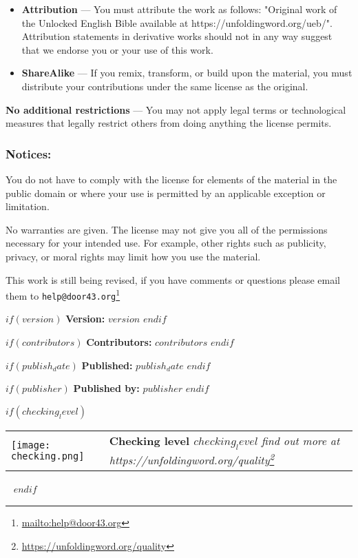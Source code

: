 \documentclass[$fontsize$pt,$if(lang)$$lang$,$endif$$if(papersize)$$papersize$,$endif$$for(classoption)$$classoption$$sep$,$endfor$,openany]{$documentclass$}
\renewcommand{\href}[2]{#2\footnote{\url{#1}}}
\begin{document}
\begin{itemize}
\item \textbf{Attribution} — You must attribute the work as follows: "Original work of the Unlocked English Bible available at https://unfoldingword.org/ueb/". Attribution statements in derivative works should not in any way suggest that we endorse you or your use of this work.
\item \textbf{ShareAlike} — If you remix, transform, or build upon the material, you must distribute your contributions under the same license as the original.
\end{itemize}

\textbf{No additional restrictions} — You may not apply legal terms or technological measures that legally restrict others from doing anything the license permits.

\subsubsection{Notices:}

You do not have to comply with the license for elements of the material in the public domain or where your use is permitted by an applicable exception or limitation.

No warranties are given. The license may not give you all of the permissions necessary for your intended use. For example, other rights such as publicity, privacy, or moral rights may limit how you use the material.

This work is still being revised, if you have comments or questions please email them to \href{mailto:help@door43.org}{\nolinkurl{help@door43.org}}

\vspace{10 mm}

$if(version)$
  \textbf{Version:} $version$
$endif$

$if(contributors)$
  \textbf{Contributors:} $contributors$
$endif$

$if(publish_date)$
  \textbf{Published:} $publish_date$
$endif$

$if(publisher)$
  \textbf{Published by:} $publisher$
$endif$

$if(checking_level)$
\begin{tabular}{@{}p{1.5cm} p{10cm}@{}}
    \vspace{0pt}
    \texttt{[image: checking.png]}
    &
    \vspace{0pt}
    \textbf{Checking level $checking_level$}
    \newline
    \newline
    \em{find out more at \href{https://unfoldingword.org/quality}{https://unfoldingword.org/quality}}
\end{tabular}
\hfill\
$endif$
\end{document}
